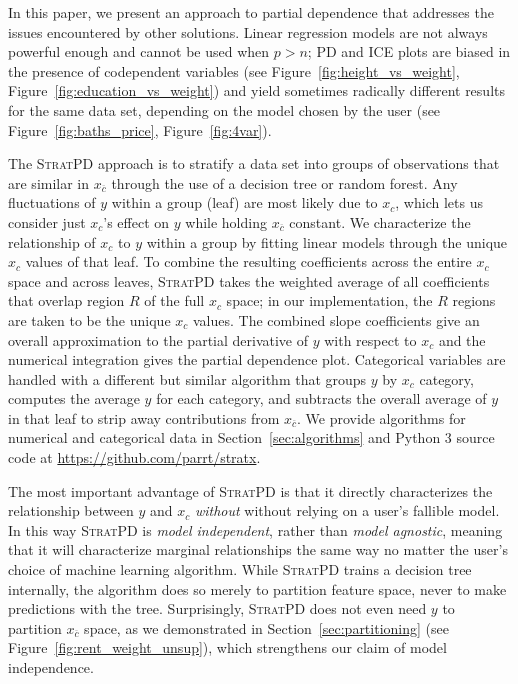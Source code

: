 \documentclass[12pt]{article}
\newcommand{\secref}[1]{Section~\ref{#1}}
\newcommand{\figref}[1]{Figure~\ref{#1}}
\newcommand{\spd}{\fontfamily{cmr}\textsc{\small StratPD}}
\newcommand{\xnc}{$x_{\overline{c}}$}
\begin{document}
In this paper, we present an approach to partial dependence that addresses the issues encountered by other solutions.  Linear regression models are not always powerful enough and cannot be used when $p>n$; PD and ICE plots are biased in the presence of codependent variables (see \figref{fig:height_vs_weight}, \figref{fig:education_vs_weight}) and yield sometimes radically different results for the same data set, depending on the model chosen by the user (see \figref{fig:baths_price}, \figref{fig:4var}).

The \spd{}  approach is to stratify a data set into groups of observations that are similar in \xnc{} through the use of a decision tree or random forest. Any fluctuations of $y$ within a group (leaf) are most likely due to $x_c$, which lets us consider just $x_c$'s effect on $y$ while holding \xnc{} constant. We characterize the relationship of $x_c$ to $y$ within a group by fitting linear models through the unique $x_c$ values of that leaf.  To combine the resulting coefficients across the entire $x_c$ space and across leaves, \spd{} takes the weighted average of all coefficients that overlap region $R$ of the full $x_c$ space; in our implementation, the $R$ regions are taken to be the unique $x_c$ values. The combined slope coefficients give an overall approximation to the partial derivative of $y$ with respect to $x_c$ and the numerical integration gives the partial dependence plot. Categorical variables are handled with a different but similar algorithm that groups $y$ by $x_c$ category, computes the average $y$ for each category, and subtracts the overall average of $y$ in that leaf to strip away contributions from \xnc. We provide algorithms for numerical and categorical data in \secref{sec:algorithms} and Python 3 source code at {\small \url{https://github.com/parrt/stratx}}.

The most important advantage of \spd{} is that it directly characterizes the relationship between $y$ and $x_c$ \emph{without} without relying on a user's fallible model. In this way \spd{} is {\em model independent}, rather than {\em model agnostic}, meaning that it will characterize marginal relationships the same way no matter the user's choice of machine learning algorithm.  While \spd{} trains a decision tree internally, the algorithm does so merely to partition feature space, never to make predictions with the tree. Surprisingly, \spd{} does not even need $y$ to  partition \xnc{} space, as we demonstrated in \secref{sec:partitioning} (see \figref{fig:rent_weight_unsup}), which strengthens our claim of model independence. 
\end{document}
